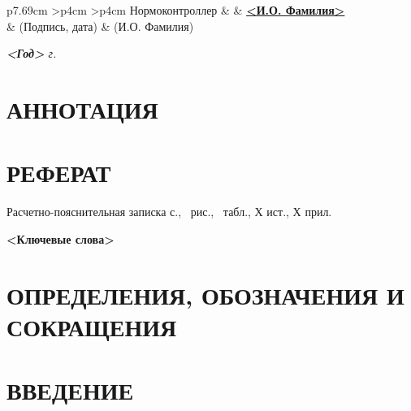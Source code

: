 \documentclass[utf8x, 14pt, oneside, a4paper]{article}
\newenvironment{signstabular}[1][1]{
	\renewcommand*{\arraystretch}{#1}
	\tabular
}{
	\endtabular
}
\begin{document}
\begin{titlepage}
\begin{table}[h!]
			\vspace{\baselineskip}

			\begin{signstabular}[0.7]{p{7.69cm} >{\centering\arraybackslash}p{4cm} >{\centering\arraybackslash}p{4cm}}
				Нормоконтроллер & \uline{\hspace*{4cm}} & \uline{\hfill \textbf{<И.О. Фамилия>} \hfill} \\
				& \scriptsize (Подпись, дата) & \scriptsize (И.О. Фамилия)
			\end{signstabular}
		\end{table}

		\vfill

		\begin{center}
			\normalsize \textit{\textbf{<Год>} г.}
		\end{center}
	\end{titlepage}

	\normalsize
	\setcounter{page}{4}
	\section*{АННОТАЦИЯ}

	\pagebreak

	\section*{РЕФЕРАТ}
		\begin{center}
			Расчетно-пояснительная записка \pageref{LastPage} с., \totalfigures\ рис., \totaltables\ табл., Х ист., Х прил.

			\textbf{<Ключевые слова>}
		\end{center}

		\pagebreak

	\renewcommand{\contentsname}{\normalsize\bfseries\centering СОДЕРЖАНИЕ}
	\small
	\tableofcontents
	\normalsize

		\pagebreak

	\section*{ОПРЕДЕЛЕНИЯ, ОБОЗНАЧЕНИЯ И СОКРАЩЕНИЯ}

		\pagebreak

	\section*{ВВЕДЕНИЕ}
\end{document}
